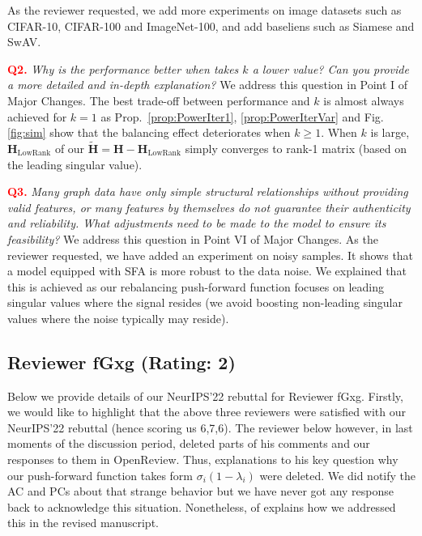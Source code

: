 As the reviewer requested, we add more experiments on image datasets such as CIFAR-10, CIFAR-100 and ImageNet-100, and add baseliens such as Siamese and SwAV.

\vspace{0.1cm} \noindent\textcolor{red}{\bf Q2.} {\em Why is the performance better when takes $k$ a lower value? Can you provide a more detailed and in-depth explanation? }
We address this question in {\color{blue}Point I} of {\color{blue}Major Changes}. The best trade-off between performance and $k$ is almost always achieved for $k=1$ as Prop.~\ref{prop:PowerIter1}, \ref{prop:PowerIterVar} and Fig. \ref{fig:sim} show that the balancing effect deteriorates when $k \geq 1$. When $k$ is large, $\mathbf{H}_{\text{LowRank}}$ of our $\widetilde{\mathbf{H}}=\mathbf{H}-\mathbf{H}_{\text{LowRank}}$ simply converges to rank-1 matrix (based on the leading singular value).

\vspace{0.1cm} \noindent\textcolor{red}{\bf Q3. } {\em Many graph data have only simple structural relationships without providing valid features, or many features by themselves do not guarantee their authenticity and reliability. What adjustments need to be made to the model to ensure its feasibility? }
We address this question in {\color{blue}Point VI} of {\color{blue}Major Changes}. As the reviewer requested, we have added an experiment on noisy samples. It shows that a model equipped with SFA is more robust to the data noise. We explained that this is achieved as our rebalancing push-forward function focuses on leading singular values where the signal resides (we avoid boosting non-leading singular values where the noise  typically may reside).

\vspace{0.4cm}
\subsection{Reviewer fGxg (Rating: 2)}

Below we provide details of our NeurIPS'22 rebuttal for Reviewer fGxg. Firstly, we would like to highlight that the above three reviewers were satisfied with our NeurIPS'22 rebuttal (hence scoring us 6,7,6). The reviewer below however, in last moments of the discussion period, deleted parts of his comments and our responses to them  in OpenReview. Thus, explanations to his key question why our push-forward function takes form $\sigma_i(1-\lambda_i)$ were deleted. We did notify the AC and PCs about that strange behavior but we have never got any response back to acknowledge this situation. Nonetheless, {\color{blue}{Point VIII}} of {\color{blue}{Major Changes}} explains how we addressed this in the revised manuscript.


